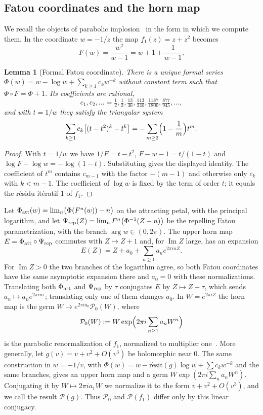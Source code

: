 \documentclass[11pt]{amsart}
\newtheorem{lemma}[theorem]{Lemma}
\theoremstyle{definition}
\theoremstyle{remark}
\newcommand{\PP}{\mathcal{P}_0}
\newcommand{\resit}{\operatorname{r\acute{e}sit}}
\begin{document}
\subsection{Fatou coordinates and the horn map}
We recall the objects of parabolic implosion~\cite{Lavaurs,Sh,IS,LY} in the form in which we compute them. In the coordinate $w=-1/z$ the map $f_1(z)=z+z^2$ becomes
\[
F(w)=\frac{w^2}{w-1}=w+1+\frac1{w-1}.
\]

\begin{lemma}[Formal Fatou coordinate]\label{lem:fatou}
There is a unique formal series $\Phi(w)=w-\log w+\sum_{k\ge1}c_kw^{-k}$ without constant term such that $\Phi\circ F=\Phi+1$. Its coefficients are rational,
\[c_1,c_2,\ldots=\tfrac12,\tfrac13,\tfrac{13}{36},\tfrac{113}{240},\tfrac{1187}{1800},\tfrac{877}{945},\ldots,\]
and with $t=1/w$ they satisfy the triangular system
\[
\sum_{k\ge1}c_k\bigl[(t-t^2)^k-t^k\bigr]=-\sum_{m\ge2}\Bigl(1-\frac1m\Bigr)t^m .
\]
\end{lemma}

\begin{proof}
With $t=1/w$ we have $1/F=t-t^2$, $F-w-1=t/(1-t)$ and $\log F-\log w=-\log(1-t)$. Substituting gives the displayed identity. The coefficient of $t^m$ contains $c_{m-1}$ with the factor $-(m-1)$ and otherwise only $c_k$ with $k<m-1$. The coefficient of $\log w$ is fixed by the term of order $t$; it equals the r\'esidu it\'eratif $1$ of $f_1$.
\end{proof}

Let $\Phi_{\rm att}(w)=\lim_n\bigl(\Phi(F^n(w))-n\bigr)$ on the attracting petal, with the principal logarithm, and let $\Psi_{\rm rep}(Z)=\lim_nF^n\bigl(\Phi^{-1}(Z-n)\bigr)$ be the repelling Fatou parametrization, with the branch $\arg w\in(0,2\pi)$. The upper horn map $E=\Phi_{\rm att}\circ\Psi_{\rm rep}$ commutes with $Z\mapsto Z+1$ and, for $\operatorname{Im}Z$ large, has an expansion
\[
E(Z)=Z+a_0+\sum_{n\ge1}a_ne^{2\pi inZ}.
\]
For $\operatorname{Im}Z>0$ the two branches of the logarithm agree, so both Fatou coordinates have the same asymptotic expansion there and $a_0=0$ with these normalizations. Translating both $\Phi_{\rm att}$ and $\Psi_{\rm rep}$ by $\tau$ conjugates $E$ by $Z\mapsto Z+\tau$, which sends $a_n\mapsto a_ne^{2\pi in\tau}$; translating only one of them changes $a_0$. In $W=e^{2\pi iZ}$ the horn map is the germ $W\mapsto e^{2\pi ia_0}\PP(W)$, where
\[
\PP(W):=W\exp\Bigl(2\pi i\sum_{n\ge1}a_nW^n\Bigr)
\]
is the parabolic renormalization of $f_1$, normalized to multiplier one~\cite{IS,LY}. More generally, let $g(v)=v+v^2+O(v^3)$ be holomorphic near $0$. The same construction in $w=-1/v$, with $\Phi(w)=w-\resit(g)\log w+\sum c_kw^{-k}$ and the same branches, gives an upper horn map and a germ $W\exp(2\pi i\sum_na_nW^n)$. Conjugating it by $W\mapsto2\pi ia_1W$ we normalize it to the form $v+v^2+O(v^3)$, and we call the result $\mathcal P(g)$. Thus $\PP$ and $\mathcal P(f_1)$ differ only by this linear conjugacy.
\end{document}
